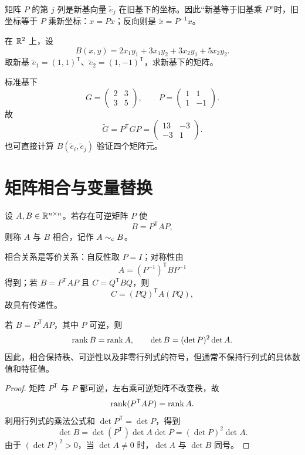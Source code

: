 \begin{pitfall}[基变换与坐标变换的方向]
矩阵 $P$ 的第 $j$ 列是新基向量 $\widetilde e_j$ 在旧基下的坐标。因此“新基等于旧基乘 $P$”时，旧坐标等于 $P$ 乘新坐标：$x=P\widetilde x$；反向则是 $\widetilde x=P^{-1}x$。
\end{pitfall}

\begin{example}[title={计算新基下的 Gram 矩阵}]
在 $\mathbb{R}^2$ 上，设
\[
B(x,y)=2x_1y_1+3x_1y_2+3x_2y_1+5x_2y_2.
\]
取新基 $\widetilde e_1=(1,1)^{\mathsf T}$、$\widetilde e_2=(1,-1)^{\mathsf T}$，求新基下的矩阵。
\begin{solution}
标准基下
\[
G=\begin{pmatrix}2&3\\3&5\end{pmatrix},\qquad
P=\begin{pmatrix}1&1\\1&-1\end{pmatrix}.
\]
故
\[
\widetilde G=P^{\mathsf T}GP
=\begin{pmatrix}13&-3\\-3&1\end{pmatrix}.
\]
也可直接计算 $B(\widetilde e_i,\widetilde e_j)$ 验证四个矩阵元。
\end{solution}
\end{example}

\section{矩阵相合与变量替换}

\begin{definition}[矩阵相合]
设 $A,B\in\mathbb{R}^{n\times n}$。若存在可逆矩阵 $P$ 使
\[
B=P^{\mathsf T}AP,
\]
则称 $A$ 与 $B$ 相合，记作 $A\sim_{\mathrm c} B$。
\end{definition}

相合关系是等价关系：自反性取 $P=I$；对称性由
\[
A=(P^{-1})^{\mathsf T}BP^{-1}
\]
得到；若 $B=P^{\mathsf T}AP$ 且 $C=Q^{\mathsf T}BQ$，则
\[
C=(PQ)^{\mathsf T}A(PQ),
\]
故具有传递性。

\begin{proposition}[相合变换的基础不变量]
若 $B=P^{\mathsf T}AP$，其中 $P$ 可逆，则
\[
\operatorname{rank} B=\operatorname{rank} A,\qquad
\det B=(\det P)^2\det A.
\]
因此，相合保持秩、可逆性以及非零行列式的符号，但通常不保持行列式的具体数值和特征值。
\end{proposition}
\begin{proof}
矩阵 $P^{\mathsf T}$ 与 $P$ 都可逆，左右乘可逆矩阵不改变秩，故
\[
\operatorname{rank}(P^{\mathsf T}AP)=\operatorname{rank} A.
\]
利用行列式的乘法公式和 $\det P^{\mathsf T}=\det P$，得到
\[
\det B=\det(P^{\mathsf T})\det A\det P
=(\det P)^2\det A.
\]
由于 $(\det P)^2>0$，当 $\det A\ne0$ 时，$\det A$ 与 $\det B$ 同号。
\end{proof}

